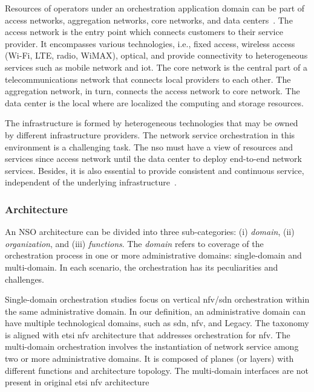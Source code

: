 Resources of operators under an orchestration application domain can be part of access networks, aggregation networks, core networks, and data centers~\cite{5GPPPArchitectureWorkingGroup2016ViewArchitecture}. The access network is the entry point which connects customers to their service provider. It encompasses various technologies, i.e., fixed access, wireless access (Wi-Fi, LTE, radio, WiMAX), optical, and provide connectivity to heterogeneous services such as mobile network and \gls{iot}. The core network is the central part of a telecommunications network that connects local providers to each other. The aggregation network, in turn, connects the access network to core network. The data center is the local where are localized the computing and storage resources.

The infrastructure is formed by heterogeneous technologies that may be owned by different infrastructure providers. The network service orchestration in this environment is a challenging task. The \gls{nso} must have a view of resources and services since access network until the data center to deploy end-to-end network services. Besides, it is also essential to provide consistent and continuous service, independent of the underlying infrastructure~\cite{5GPPPArchitectureWorkingGroup2016ViewArchitecture}. 

\subsubsection{Architecture}
An NSO architecture can be divided into three sub-categories: (i) \textit{domain}, (ii) \textit{organization}, and (iii) \textit{functions}. The \textit{domain} refers to coverage of the orchestration process in one or more administrative domains: single-domain and multi-domain. In each scenario, the orchestration has its peculiarities and challenges.

Single-domain orchestration studies focus on vertical \gls{nfv}/\gls{sdn} orchestration within the same administrative domain. In our definition, an administrative domain can have multiple technological domains, such as \gls{sdn}, \gls{nfv}, and Legacy. The taxonomy is aligned with \gls{etsi} \gls{nfv} architecture that addresses orchestration for \gls{nfv}. The multi-domain orchestration involves the instantiation of network service among two or more administrative domains. It is composed of planes (or layers) with different functions and architecture topology. The multi-domain interfaces are not present in original \gls{etsi} \gls{nfv} architecture

